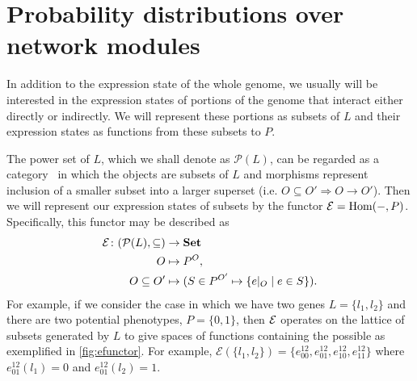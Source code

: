 
\section{Probability distributions over network modules}\label{sec:probabilitydistributionsonnetworks}

In addition to the expression state of the whole genome, we usually will be interested in the expression states of portions of the genome that interact either directly or indirectly.  We will represent these portions as subsets of $L$ and their expression states as functions from these subsets to $P$.

The power set of $L$, which we shall denote as $\mathcal{P}(L)$, can be regarded  as a category~\cite{Lane1998,MacLane1992,Awodey2006,Abramsky2011} in which the objects are subsets of $L$ and morphisms represent inclusion of a smaller subset into a larger superset (i.e. $O \subseteq O' \Rightarrow O \rightarrow O'$).  Then we will represent our expression states of subsets by the functor $\mathcal{E} = \mathrm{Hom}(-,P)$.  Specifically, this functor may be described as
\begin{equation}\label{eq:gpfunctor}
\begin{split}
\expr \colon (\mathcal{P}(L), \subseteq) &\to \mathbf{Set} \\
O &\mapsto P^O,\\
O \subseteq O' &\mapsto (S \in P^{O'} \mapsto \{e|_O \mid e \in S\}). %
\end{split}
\end{equation}
For example, if we consider the case in which we have two genes $L=\{l_1,l_2\}$ and there are two potential phenotypes, $P=\{0,1\}$, then $\mathcal{E}$ operates on the lattice of subsets generated by $L$ to give spaces of functions containing the possible \gnpm{} as exemplified in \ref{fig:efunctor}. For example, $\mathcal{E}(\{l_1,l_2\}) = \{ e^{12}_{00},e^{12}_{01},e^{12}_{10},e^{12}_{11} \}$ where $e^{12}_{01}(l_1) = 0$ and $e^{12}_{01}(l_2) = 1$.

